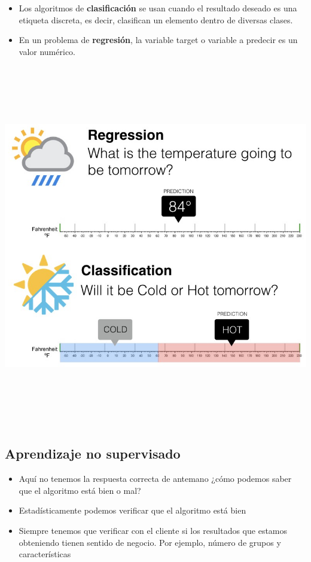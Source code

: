 \documentclass[
]{book}
\begin{document}
\begin{itemize}
\item
  Los algoritmos de \textbf{clasificación} se usan cuando el resultado deseado es una etiqueta discreta, es decir, clasifican un elemento dentro de diversas clases.
\item
  En un problema de \textbf{regresión}, la variable target o variable a predecir es un valor numérico.
\end{itemize}

\begin{center}\includegraphics[width=700pt,height=450pt]{img/01-repaso/13_regresion_clasificacion} \end{center}

\hypertarget{aprendizaje-no-supervisado}{%
\subsection{Aprendizaje no supervisado}\label{aprendizaje-no-supervisado}}

\begin{itemize}
\item
  Aquí no tenemos la respuesta correcta de antemano ¿cómo podemos saber que el algoritmo está bien o mal?
\item
  Estadísticamente podemos verificar que el algoritmo está bien
\item
  Siempre tenemos que verificar con el cliente si los resultados que estamos obteniendo tienen sentido de negocio. Por ejemplo, número de grupos y características
\end{itemize}
\end{document}
